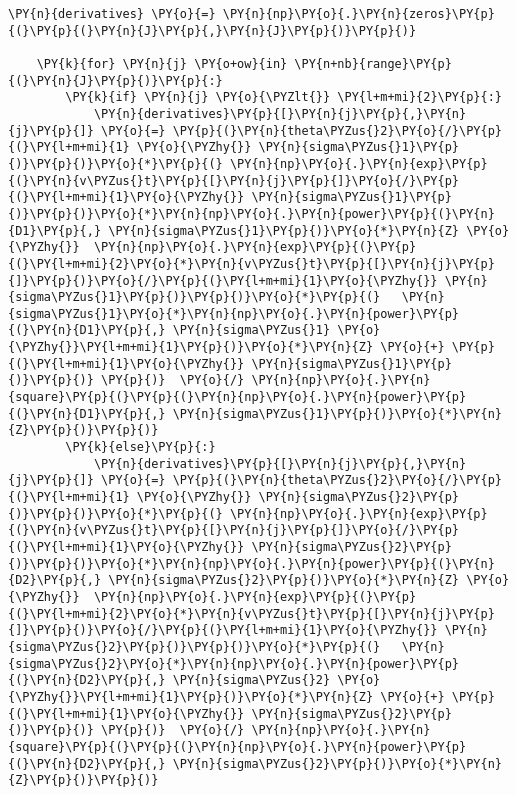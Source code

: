 \begin{tcolorbox}[breakable, size=fbox, boxrule=1pt, pad at break*=1mm,colback=cellbackground, colframe=cellborder]
\begin{Verbatim}[commandchars=\\\{\}]
    \PY{n}{derivatives} \PY{o}{=} \PY{n}{np}\PY{o}{.}\PY{n}{zeros}\PY{p}{(}\PY{p}{(}\PY{n}{J}\PY{p}{,}\PY{n}{J}\PY{p}{)}\PY{p}{)}

    \PY{k}{for} \PY{n}{j} \PY{o+ow}{in} \PY{n+nb}{range}\PY{p}{(}\PY{n}{J}\PY{p}{)}\PY{p}{:}
        \PY{k}{if} \PY{n}{j} \PY{o}{\PYZlt{}} \PY{l+m+mi}{2}\PY{p}{:}
            \PY{n}{derivatives}\PY{p}{[}\PY{n}{j}\PY{p}{,}\PY{n}{j}\PY{p}{]} \PY{o}{=} \PY{p}{(}\PY{n}{theta\PYZus{}2}\PY{o}{/}\PY{p}{(}\PY{l+m+mi}{1} \PY{o}{\PYZhy{}} \PY{n}{sigma\PYZus{}1}\PY{p}{)}\PY{p}{)}\PY{o}{*}\PY{p}{(} \PY{n}{np}\PY{o}{.}\PY{n}{exp}\PY{p}{(}\PY{n}{v\PYZus{}t}\PY{p}{[}\PY{n}{j}\PY{p}{]}\PY{o}{/}\PY{p}{(}\PY{l+m+mi}{1}\PY{o}{\PYZhy{}} \PY{n}{sigma\PYZus{}1}\PY{p}{)}\PY{p}{)}\PY{o}{*}\PY{n}{np}\PY{o}{.}\PY{n}{power}\PY{p}{(}\PY{n}{D1}\PY{p}{,} \PY{n}{sigma\PYZus{}1}\PY{p}{)}\PY{o}{*}\PY{n}{Z} \PY{o}{\PYZhy{}}  \PY{n}{np}\PY{o}{.}\PY{n}{exp}\PY{p}{(}\PY{p}{(}\PY{l+m+mi}{2}\PY{o}{*}\PY{n}{v\PYZus{}t}\PY{p}{[}\PY{n}{j}\PY{p}{]}\PY{p}{)}\PY{o}{/}\PY{p}{(}\PY{l+m+mi}{1}\PY{o}{\PYZhy{}} \PY{n}{sigma\PYZus{}1}\PY{p}{)}\PY{p}{)}\PY{o}{*}\PY{p}{(}   \PY{n}{sigma\PYZus{}1}\PY{o}{*}\PY{n}{np}\PY{o}{.}\PY{n}{power}\PY{p}{(}\PY{n}{D1}\PY{p}{,} \PY{n}{sigma\PYZus{}1} \PY{o}{\PYZhy{}}\PY{l+m+mi}{1}\PY{p}{)}\PY{o}{*}\PY{n}{Z} \PY{o}{+} \PY{p}{(}\PY{l+m+mi}{1}\PY{o}{\PYZhy{}} \PY{n}{sigma\PYZus{}1}\PY{p}{)}\PY{p}{)} \PY{p}{)}  \PY{o}{/} \PY{n}{np}\PY{o}{.}\PY{n}{square}\PY{p}{(}\PY{p}{(}\PY{n}{np}\PY{o}{.}\PY{n}{power}\PY{p}{(}\PY{n}{D1}\PY{p}{,} \PY{n}{sigma\PYZus{}1}\PY{p}{)}\PY{o}{*}\PY{n}{Z}\PY{p}{)}\PY{p}{)}
        \PY{k}{else}\PY{p}{:}
            \PY{n}{derivatives}\PY{p}{[}\PY{n}{j}\PY{p}{,}\PY{n}{j}\PY{p}{]} \PY{o}{=} \PY{p}{(}\PY{n}{theta\PYZus{}2}\PY{o}{/}\PY{p}{(}\PY{l+m+mi}{1} \PY{o}{\PYZhy{}} \PY{n}{sigma\PYZus{}2}\PY{p}{)}\PY{p}{)}\PY{o}{*}\PY{p}{(} \PY{n}{np}\PY{o}{.}\PY{n}{exp}\PY{p}{(}\PY{n}{v\PYZus{}t}\PY{p}{[}\PY{n}{j}\PY{p}{]}\PY{o}{/}\PY{p}{(}\PY{l+m+mi}{1}\PY{o}{\PYZhy{}} \PY{n}{sigma\PYZus{}2}\PY{p}{)}\PY{p}{)}\PY{o}{*}\PY{n}{np}\PY{o}{.}\PY{n}{power}\PY{p}{(}\PY{n}{D2}\PY{p}{,} \PY{n}{sigma\PYZus{}2}\PY{p}{)}\PY{o}{*}\PY{n}{Z} \PY{o}{\PYZhy{}}  \PY{n}{np}\PY{o}{.}\PY{n}{exp}\PY{p}{(}\PY{p}{(}\PY{l+m+mi}{2}\PY{o}{*}\PY{n}{v\PYZus{}t}\PY{p}{[}\PY{n}{j}\PY{p}{]}\PY{p}{)}\PY{o}{/}\PY{p}{(}\PY{l+m+mi}{1}\PY{o}{\PYZhy{}} \PY{n}{sigma\PYZus{}2}\PY{p}{)}\PY{p}{)}\PY{o}{*}\PY{p}{(}   \PY{n}{sigma\PYZus{}2}\PY{o}{*}\PY{n}{np}\PY{o}{.}\PY{n}{power}\PY{p}{(}\PY{n}{D2}\PY{p}{,} \PY{n}{sigma\PYZus{}2} \PY{o}{\PYZhy{}}\PY{l+m+mi}{1}\PY{p}{)}\PY{o}{*}\PY{n}{Z} \PY{o}{+} \PY{p}{(}\PY{l+m+mi}{1}\PY{o}{\PYZhy{}} \PY{n}{sigma\PYZus{}2}\PY{p}{)}\PY{p}{)} \PY{p}{)}  \PY{o}{/} \PY{n}{np}\PY{o}{.}\PY{n}{square}\PY{p}{(}\PY{p}{(}\PY{n}{np}\PY{o}{.}\PY{n}{power}\PY{p}{(}\PY{n}{D2}\PY{p}{,} \PY{n}{sigma\PYZus{}2}\PY{p}{)}\PY{o}{*}\PY{n}{Z}\PY{p}{)}\PY{p}{)}



\end{Verbatim}
\end{tcolorbox}
